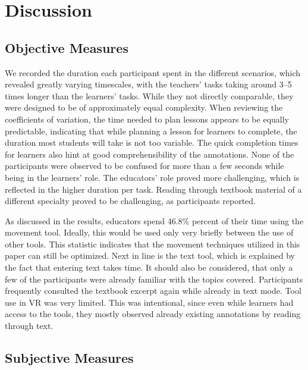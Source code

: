 \section{Discussion}


\subsection{Objective Measures}

We recorded the duration each participant spent in the different scenarios, which revealed greatly varying timescales, with the teachers' tasks taking around 3–5 times longer than the learners' tasks. While they not directly comparable, they were designed to be of approximately equal complexity. When reviewing the coefficients of variation, the time needed to plan lessons appears to be equally predictable, indicating that while planning a lesson for learners to complete, the duration most students will take is not too variable. The quick completion times for learners also hint at good comprehensibility of the annotations. None of the participants were observed to be confused for more than a few seconds while being in the learners' role. The educators' role proved more challenging, which is reflected in the higher duration per task. Reading through textbook material of a different specialty proved to be challenging, as participants reported.

As discussed in the results, educators spend 46.8\% percent of their time using the movement tool. Ideally, this would be used only very briefly between the use of other tools. This statistic indicates that the movement techniques utilized in this paper can still be optimized. Next in line is the text tool, which is explained by the fact that entering text takes time. It should also be considered, that only a few of the participants were already familiar with the topics covered. Participants frequently consulted the textbook excerpt again while already in text mode. Tool use in VR was very limited. This was intentional, since even while learners had access to the tools, they mostly observed already existing annotations by reading through text.

\subsection{Subjective Measures}

